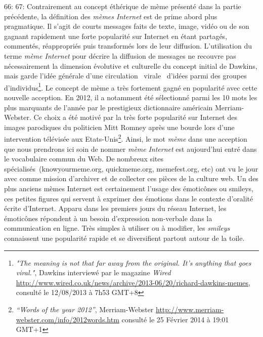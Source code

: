 66: 
67: Contrairement au concept \'eth\'erique de m\`eme pr\'esent\'e dans la partie pr\'ec\'edente, la d\'efinition des \textit{m\`emes Internet }est de prime abord plus pragmatique. Il s{\textquoteright}agit de courts messages faits de texte, image, vid\'eo ou de son gagnant rapidement une forte popularit\'e sur Internet en \'etant partag\'es, comment\'es, r\'eappropri\'es puis transform\'es lors de leur diffusion. L{\textquoteright}utilisation du terme \textit{m\`eme Internet }pour d\'ecrire la diffusion de messages ne recouvre pas n\'ecessairement la dimension \'evolutive et culturelle du concept initial de Dawkins, mais garde l{\textquoteright}id\'ee g\'en\'erale d{\textquoteright}une circulation {\guillemotleft}~virale~{\guillemotright} d{\textquoteright}id\'ees parmi des groupes d{\textquoteright}individus\footnote{ \textit{"The meaning is not that far away from the original. It's anything that goes viral."}, Dawkins interview\'e par le magazine \textit{Wired} \url{http://www.wired.co.uk/news/archive/2013-06/20/richard-dawkins-memes}, consult\'e le 12/08/2013 \`a 7h53 GMT+8}. Le concept de m\`eme a tr\`es fortement gagn\'e en popularit\'e avec cette nouvelle acception. En 2012, il a notamment \'et\'e s\'electionn\'e parmi les 10 mots les plus marquants de l{\textquoteright}ann\'ee par le prestigieux dictionnaire am\'ericain Merriam-Webster. Ce choix a \'et\'e motiv\'e par la tr\`es forte popularit\'e sur Internet des images parodiques du politicien Mitt Romney apr\`es une bourde lors d{\textquoteright}une intervention t\'el\'evis\'ee aux Etats-Unis\footnote{ \textit{{\textquotedblleft}Words of the year 2012{\textquotedblright}}, Merriam-Webster \url{http://www.merriam-webster.com/info/2012words.htm} consult\'e le 25 F\'evrier 2014 \`a 19:01 GMT+1}. Ainsi, le mot \textit{m\`eme }dans une acception que nous prendrons ici soin de nommer \textit{m\`eme} \textit{Internet} est aujourd{\textquoteright}hui entr\'e dans le vocabulaire commun du Web. De nombreux sites sp\'ecialis\'es~(knowyourmeme.org, quickmeme.org, memefest.org, etc) ont vu le jour avec comme mission d{\textquoteright}archiver et de collecter ces pi\`eces de la culture web. Un des plus anciens m\`emes Internet est certainement l{\textquoteright}usage des \'emotic\^ones ou smileys, ces petites figures qui servent \`a exprimer des \'emotions dans le contexte d{\textquoteright}oralit\'e \'ecrite d{\textquoteright}Internet. Apparu dans les premiers jours du r\'eseau Internet, les \'emotic\^ones r\'epondent \`a un besoin d{\textquoteright}expression non-verbale dans la communication en ligne. Tr\`es simples \`a utiliser ou \`a modifier, les \textit{smileys }connaissent une popularit\'e rapide et se diversifient partout autour de la toile.  
